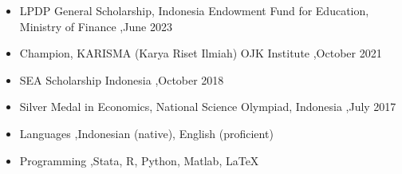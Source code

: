 \documentclass[letterpaper,10pt]{article}
\begin{document}

\begin{itemize}
\item LPDP General Scholarship, Indonesia Endowment Fund for Education, Ministry of Finance \sep June 2023
\item Champion, KARISMA (Karya Riset Ilmiah) OJK Institute \sep October 2021
\item SEA Scholarship Indonesia \sep October 2018
\item Silver Medal in Economics, National Science Olympiad, Indonesia \sep July 2017
\end{itemize}


\begin{itemize}
\item Languages \sep Indonesian (native), English (proficient)
\item Programming \sep Stata, R, Python, Matlab, \LaTeX
\end{itemize}
\end{document}
